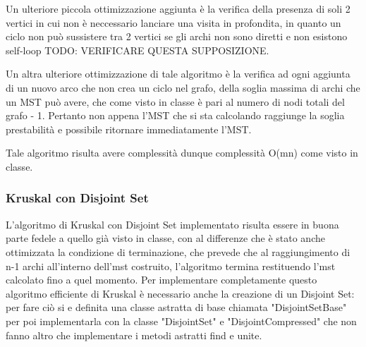 Un ulteriore piccola ottimizzazione aggiunta è la verifica della presenza di soli 2 vertici in cui non è neccessario lanciare una visita in profondita, in quanto un ciclo non può sussistere tra 2 vertici se gli archi non sono diretti e non esistono self-loop TODO: VERIFICARE QUESTA SUPPOSIZIONE.

Un altra ulteriore ottimizzazione di tale algoritmo è la verifica ad ogni aggiunta di un nuovo arco che non crea un ciclo nel grafo, della soglia massima di archi che un MST può avere, che come visto in classe è pari al numero di nodi totali del grafo - 1. Pertanto non appena l'MST che si sta calcolando raggiunge la soglia prestabilità e possibile ritornare immediatamente l'MST.

Tale algoritmo risulta avere complessità dunque complessità O(mn) come visto in classe.


\subsubsection{Kruskal con Disjoint Set}
L'algoritmo di Kruskal con Disjoint Set implementato risulta essere in buona parte fedele a quello già visto in classe, con al differenze che è stato anche ottimizzata la condizione di terminazione, che prevede che al raggiungimento di n-1 archi all'interno dell'mst costruito, l'algoritmo termina restituendo l'mst calcolato fino a quel momento. Per implementare completamente questo algoritmo efficiente di Kruskal è necessario anche la creazione di un Disjoint Set: per fare ciò si e definita una classe astratta di base chiamata "DisjointSetBase" per poi implementarla con la classe "DisjointSet" e "DisjointCompressed" che non fanno altro che implementare i metodi astratti find e unite. 

